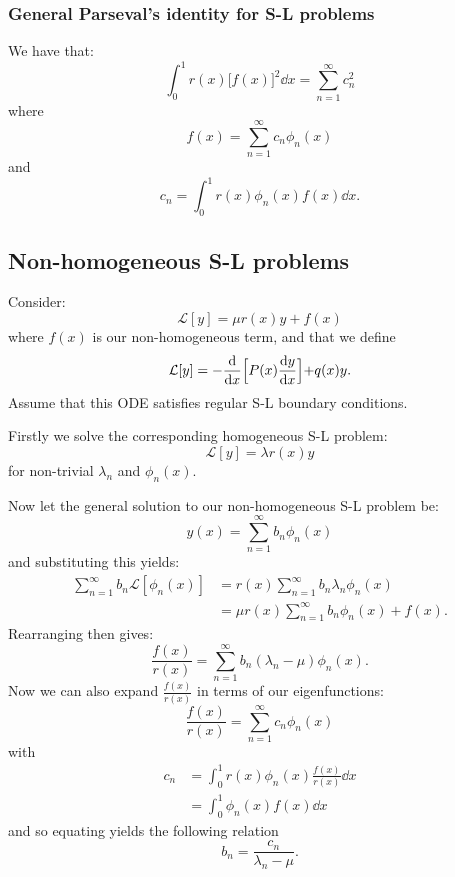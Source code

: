 \documentclass{article}
\begin{document}
\subsubsection{General Parseval's identity for S-L problems}
We have that:
$$\int_{0}^{1}r(x)\bigl[f(x)\bigr]^2\dd x
=\sum_{n=1}^{\infty}c_n^2$$
where
$$f(x)=\sum_{n=1}^{\infty} c_n\phi_n(x)$$
and
$$c_n=\int_{0}^{1}r(x)\phi_n(x)f(x)\dd x.$$

\newpage

\subsection{Non-homogeneous S-L problems}
Consider:
$$\mathcal{L}[y]=\mu r(x)y+f(x)$$
where $f(x)$ is our non-homogeneous term, and that we define
$$\mathcal{L}[y]=-\dv{x}\Bigl[P(x)\dv{y}{x}\Bigl]+q(x)y.$$
Assume that this ODE satisfies regular S-L boundary conditions.

Firstly we solve the corresponding homogeneous S-L problem:
$$\mathcal{L}[y]=\lambda r(x)y$$
for non-trivial $\lambda_n$ and $\phi_n(x)$.

Now let the general solution to our non-homogeneous S-L problem be:
$$y(x)=\sum_{n=1}^{\infty} b_n\phi_n(x)$$
and substituting this yields:
\begin{align*}
    \sum_{n=1}^{\infty}b_n\mathcal{L}[\phi_n(x)]
    &=r(x)\sum_{n=1}^{\infty}b_n\lambda_n\phi_n(x) \\
    &=\mu r(x)\sum_{n=1}^{\infty}b_n\phi_n(x)+f(x).
\end{align*}
Rearranging then gives:
$$\frac{f(x)}{r(x)}=\sum_{n=1}^{\infty}
b_n(\lambda_n-\mu)\phi_n(x).$$
Now we can also expand $\displaystyle\frac{f(x)}{r(x)}$
in terms of our eigenfunctions:
$$\frac{f(x)}{r(x)}=\sum_{n=1}^{\infty}c_n\phi_n(x)$$
with
\begin{align*}
    c_n
    &=\int_{0}^{1}r(x)\phi_n(x)
    \frac{f(x)}{r(x)} \dd x \\
    &=\int_{0}^{1}\phi_n(x)f(x)\dd x
\end{align*}
and so equating yields the following relation
$$b_n=\frac{c_n}{\lambda_n-\mu}.$$

\newpage
\end{document}
